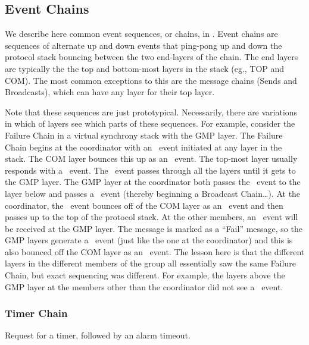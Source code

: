 \subsection{Event Chains}
We describe here common event sequences, or chains, in \ensemble.  Event chains
are sequences of alternate up and down events that ping-pong up and down
the protocol stack bouncing between the two end-layers of the chain.  The
end layers are typically the the top and bottom-most layers in the stack
(eg., TOP and COM).  The most common exceptions to this are the message
chains (Sends and Broadcasts), which can have any layer for their top
layer.

Note that these sequences are just prototypical.  Necessarily, there are
variations in which of layers see which parts of these sequences.  For
example, consider the Failure Chain in a virtual synchrony stack with the
GMP layer.  The Failure Chain begins at the coordinator with an \DnSuspect\
event initiated at any layer in the stack.  The COM layer bounces this up
as an \UpSuspect\ event.  The top-most layer usually responds with a \DnFail\
event.  The \DnFail\ event passes through all the layers until it gets to
the GMP layer.  The GMP layer at the coordinator both passes the \DnFail\
event to the layer below and passes a \DnCast\ event (thereby beginning a
Broadcast Chain\ldots).  At the coordinator, the \DnFail\ event bounces off
of the COM layer as an \UpFail\ event and then passes up to the top of the
protocol stack.  At the other members, an \UpCast\ event will be received at
the GMP layer.  The message is marked as a ``Fail'' message, so the GMP
layers generate a \DnFail\ event (just like the one at the coordinator) and
this is also bounced off the COM layer as an \UpFail\ event.  The lesson here
is that the different layers in the different members of the group all
essentially saw the same Failure Chain, but exact sequencing was different.
For example, the layers above the GMP layer at the members other than the
coordinator did not see a \DnFail\ event. \todo{give diagram}

\todo{Leave Chain}

\subsubsection{Timer Chain}
Request for a timer, followed by an alarm timeout.
\begin{ChainTable}
\end{ChainTable}

